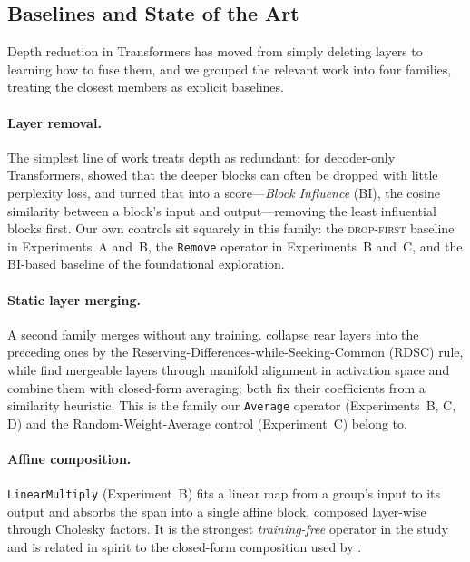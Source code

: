 \documentclass[10pt,a4paper]{article}
\newcommand{\dropfirst}{\textsc{drop-first}}
\newcommand{\removeop}{\texttt{Remove}}
\newcommand{\averageop}{\texttt{Average}}
\newcommand{\linop}{\texttt{LinearMultiply}}
\begin{document}
\subsection{Baselines and State of the Art}
\label{sec:sota}

Depth reduction in Transformers has moved from simply deleting layers to
learning how to fuse them, and we grouped the relevant work into four families,
treating the closest members as explicit baselines.

\paragraph{Layer removal.} The simplest line of work treats depth as redundant:
for decoder-only Transformers, \citet{gromov2024unreasonable} showed that the
deeper blocks can often be dropped with little perplexity loss, and
\citet{men2024shortgpt} turned that into a score---\emph{Block Influence}
(BI), the cosine similarity between a block's input and output---removing the
least influential blocks first. Our own controls sit squarely in this family:
the \dropfirst{} baseline in Experiments~A and~B, the \removeop{} operator in
Experiments~B and~C, and the BI-based baseline of the foundational
exploration.

\paragraph{Static layer merging.} A second family merges without any training.
\citet{yang2024laco} collapse rear layers into the preceding ones by the
Reserving-Differences-while-Seeking-Common (RDSC) rule, while
\citet{liu2024pruning} find mergeable layers through manifold alignment in
activation space and combine them with closed-form averaging; both fix their
coefficients from a similarity heuristic. This is the family our \averageop{}
operator (Experiments~B, C, D) and the Random-Weight-Average control
(Experiment~C) belong to.

\paragraph{Affine composition.} \linop{} (Experiment~B) fits a linear map from a
group's input to its output and absorbs the span into a single affine block,
composed layer-wise through Cholesky factors. It is the strongest
\emph{training-free} operator in the study and is related in spirit to the
closed-form composition used by \citet{yang2024laco}.
\end{document}
